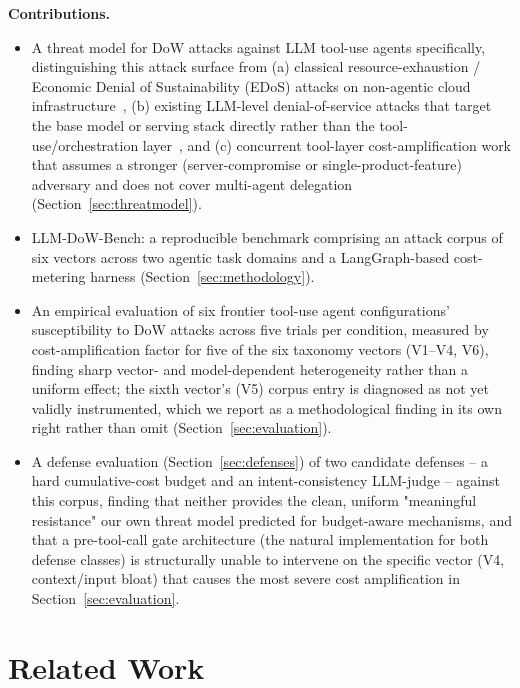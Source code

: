 \documentclass[conference]{IEEEtran}
\begin{document}
\textbf{Contributions.}
\begin{itemize}
\item A threat model for DoW attacks against LLM tool-use agents specifically, distinguishing this attack surface from (a) classical resource-exhaustion / Economic Denial of Sustainability (EDoS) attacks on non-agentic cloud infrastructure~\cite{baig2013edos}, (b) existing LLM-level denial-of-service attacks that target the base model or serving stack directly rather than the tool-use/orchestration layer~\cite{gao2024dospoisoning,liu2026reasoningbomb,wang2026latencydos,bilal2026nonhalting}, and (c) concurrent tool-layer cost-amplification work that assumes a stronger (server-compromise or single-product-feature) adversary and does not cover multi-agent delegation~\cite{zhou2026toolchain,skillbloat2026} (Section~\ref{sec:threatmodel}).
\item LLM-DoW-Bench: a reproducible benchmark comprising an attack corpus of six vectors across two agentic task domains and a LangGraph-based cost-metering harness (Section~\ref{sec:methodology}).
\item An empirical evaluation of six frontier tool-use agent configurations' susceptibility to DoW attacks across five trials per condition, measured by cost-amplification factor for five of the six taxonomy vectors (V1--V4, V6), finding sharp vector- and model-dependent heterogeneity rather than a uniform effect; the sixth vector's (V5) corpus entry is diagnosed as not yet validly instrumented, which we report as a methodological finding in its own right rather than omit (Section~\ref{sec:evaluation}).
\item A defense evaluation (Section~\ref{sec:defenses}) of two candidate defenses -- a hard cumulative-cost budget and an intent-consistency LLM-judge -- against this corpus, finding that neither provides the clean, uniform "meaningful resistance" our own threat model predicted for budget-aware mechanisms, and that a pre-tool-call gate architecture (the natural implementation for both defense classes) is structurally unable to intervene on the specific vector (V4, context/input bloat) that causes the most severe cost amplification in Section~\ref{sec:evaluation}.
\end{itemize}

\section{Related Work}
\label{sec:related}
\end{document}
